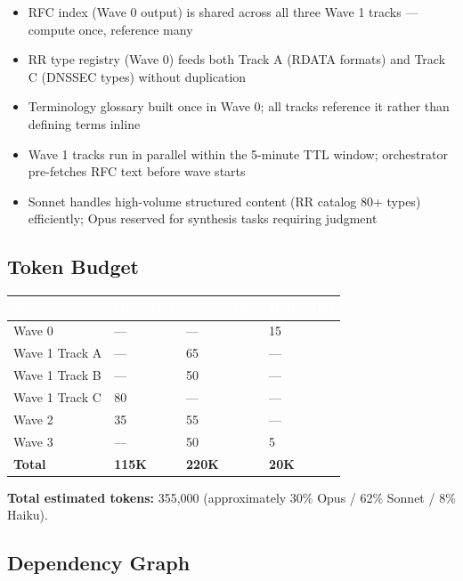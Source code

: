 \documentclass[11pt,letterpaper]{article}
\newcommand{\tableheader}[1]{\textbf{\sffamily\textcolor{white}{#1}}}
\begin{document}
\begin{itemize}
  \item RFC index (Wave 0 output) is shared across all three Wave 1 tracks --- compute once, reference many
  \item RR type registry (Wave 0) feeds both Track A (RDATA formats) and Track C (DNSSEC types) without duplication
  \item Terminology glossary built once in Wave 0; all tracks reference it rather than defining terms inline
  \item Wave 1 tracks run in parallel within the 5-minute TTL window; orchestrator pre-fetches RFC text before wave starts
  \item Sonnet handles high-volume structured content (RR catalog 80+ types) efficiently; Opus reserved for synthesis tasks requiring judgment
\end{itemize}

\subsection{Token Budget}

\begin{center}
\begin{tabularx}{\textwidth}{L{3cm}C{2.5cm}C{2.5cm}C{2.5cm}}
\toprule
{}
\tableheader{Wave} & \tableheader{Opus (K)} & \tableheader{Sonnet (K)} & \tableheader{Haiku (K)} \\
\midrule
Wave 0 & --- & --- & 15 \\
Wave 1 Track A & --- & 65 & --- \\
Wave 1 Track B & --- & 50 & --- \\
Wave 1 Track C & 80 & --- & --- \\
Wave 2 & 35 & 55 & --- \\
Wave 3 & --- & 50 & 5 \\
\midrule
\textbf{Total} & \textbf{115K} & \textbf{220K} & \textbf{20K} \\
\bottomrule
\end{tabularx}
\end{center}

\textbf{Total estimated tokens:} 355,000 (approximately 30\% Opus / 62\% Sonnet / 8\% Haiku).

\subsection{Dependency Graph}
\end{document}
